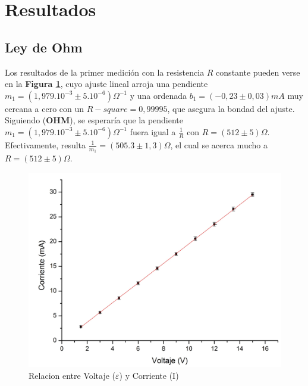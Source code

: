 \documentclass[11pt,a4paper]{article}
\begin{document}

\section{Resultados}
\label{sec:discusion}

\subsection{Ley de Ohm}

Los resultados de la primer medición con la resistencia $R$ constante pueden verse en la \textbf{Figura \ref{fig:Ohm_lin}}, cuyo ajuste lineal arroja una pendiente $m_1 = (1,979.10^{-3} \pm 5.10^{-6})\Omega^{-1}$ y una ordenada $b_1 = (-0,23\pm 0,03)mA$ muy cercana a cero con un $R-square = 0,99995$, que asegura la bondad del ajuste. Siguiendo (\textbf{OHM}), se esperaría que la pendiente $m_1 = (1,979.10^{-3} \pm 5.10^{-6})\Omega^{-1}$ fuera igual a $\frac{1}{R}$ con $R = (512 \pm 5)\Omega$. Efectivamente, resulta $\frac{1}{m_1} = (505.3 \pm 1,3)\Omega$, el cual se acerca mucho a $R = (512 \pm 5)\Omega$.

\begin{figure}[h]
  \centering
  \includegraphics[scale=0.45]{Corriente_vs_Voltaje}
  \caption{Relacion entre Voltaje ($\varepsilon$) y Corriente (I)}
  \label{fig:Ohm_lin}
\end{figure}
\end{document}
